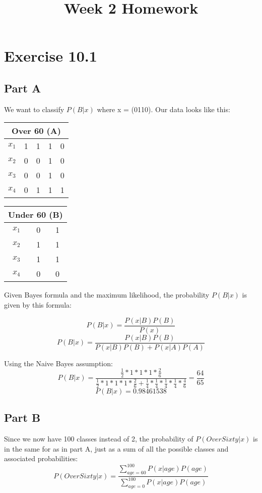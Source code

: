 \documentclass{article}
\title{Week 2 Homework}
\begin{document}
 


\section{Exercise 10.1}
\subsection{Part A}
We want to classify $P{(B | x)}$ where x = (0110). Our data looks like this:

\begin{center}
\begin{tabular}{ |c|c|c|c|c| }
\hline
\multicolumn{5}{|c|}{Over 60 (A)}\\
 \hline 
 $x_{1}$ & 1 & 1 & 1 & 0 \\ 
 $x_{2}$ & 0 & 0 & 1 & 0 \\ 
 $x_{3}$ & 0 & 0 & 1 & 0 \\ 
 $x_{4}$ & 0 & 1 & 1 & 1 \\ 
 \hline
\end{tabular}
\begin{tabular}{ |c|c|c| }
\hline
\multicolumn{3}{|c|}{Under 60 (B)}\\
 \hline 
 $x_{1}$ & 0 & 1 \\ 
 $x_{2}$ & 1 & 1 \\ 
 $x_{3}$ & 1 & 1 \\ 
 $x_{4}$ & 0 & 0 \\ 
 \hline
\end{tabular}
\end{center}

Given Bayes formula and the maximum likelihood, the probability $P{(B | x)}$ is given by this formula:

\[P{(B|x)} = \frac{P{(x|B)}P{(B)}}{P{(x)}}\] 
\[P{(B|x)} = \frac{P{(x|B)}P{(B)}}{P{(x|B)}P{(B)} + P{(x|A)}P{(A)}} \]

Using the Naive Bayes assumption:
\[P{(B|x)} = \frac{\frac{1}{2}*1*1*1*\frac{2}{6}}{\frac{1}{2}*1*1*1*\frac{2}{6} + \frac{1}{4}*\frac{1}{4}*\frac{1}{4}*\frac{1}{4}*\frac{4}{6}} = \frac{64}{65} \]
\[P{(B|x)} = \boxed{0.98461538} \]

\subsection{Part B}
Since we now have 100 classes instead of 2, the probability of $P{(OverSixty | x)}$ is in the same for as in part A, just as a sum of all the possible classes and associated probabilities:
\[P{(OverSixty|x)} = \frac{\sum\limits_{age=60}^{100}P{(x|age)}P{(age)}}{\sum\limits_{age=0}^{100}P{(x|age)}P{(age)}} \]
\end{document}
